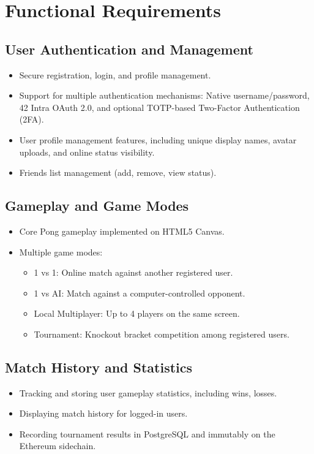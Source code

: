 \section{Functional Requirements}
\subsection*{User Authentication and Management}
\begin{itemize}
    \item Secure registration, login, and profile management.
    \item Support for multiple authentication mechanisms: Native username/password, 42 Intra OAuth 2.0, and optional TOTP-based Two-Factor Authentication (2FA).
    \item User profile management features, including unique display names, avatar uploads, and online status visibility.
    \item Friends list management (add, remove, view status).
\end{itemize}

\subsection*{Gameplay and Game Modes}
\begin{itemize}
    \item Core Pong gameplay implemented on HTML5 Canvas.
    \item Multiple game modes:
        \begin{itemize}
            \item 1 vs 1: Online match against another registered user.
            \item 1 vs AI: Match against a computer-controlled opponent.
            \item Local Multiplayer: Up to 4 players on the same screen.
            \item Tournament: Knockout bracket competition among registered users.
        \end{itemize}
\end{itemize}

\subsection*{Match History and Statistics}
\begin{itemize}
    \item Tracking and storing user gameplay statistics, including wins, losses.
    \item Displaying match history for logged-in users.
    \item Recording tournament results in PostgreSQL and immutably on the Ethereum sidechain.
\end{itemize}


